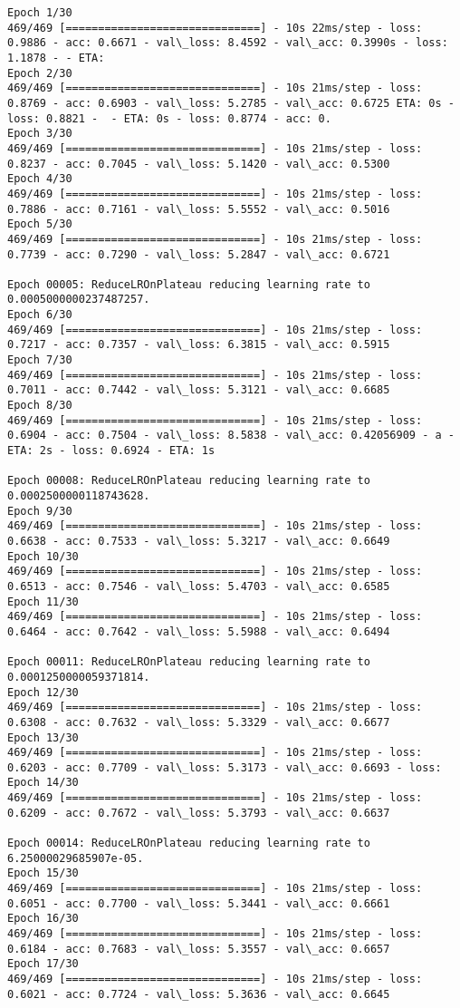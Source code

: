 \documentclass[11pt]{article}
\begin{document}
    \begin{Verbatim}[commandchars=\\\{\}]
Epoch 1/30
469/469 [==============================] - 10s 22ms/step - loss: 0.9886 - acc: 0.6671 - val\_loss: 8.4592 - val\_acc: 0.3990s - loss: 1.1878 - - ETA:
Epoch 2/30
469/469 [==============================] - 10s 21ms/step - loss: 0.8769 - acc: 0.6903 - val\_loss: 5.2785 - val\_acc: 0.6725 ETA: 0s - loss: 0.8821 -  - ETA: 0s - loss: 0.8774 - acc: 0.
Epoch 3/30
469/469 [==============================] - 10s 21ms/step - loss: 0.8237 - acc: 0.7045 - val\_loss: 5.1420 - val\_acc: 0.5300
Epoch 4/30
469/469 [==============================] - 10s 21ms/step - loss: 0.7886 - acc: 0.7161 - val\_loss: 5.5552 - val\_acc: 0.5016
Epoch 5/30
469/469 [==============================] - 10s 21ms/step - loss: 0.7739 - acc: 0.7290 - val\_loss: 5.2847 - val\_acc: 0.6721

Epoch 00005: ReduceLROnPlateau reducing learning rate to 0.0005000000237487257.
Epoch 6/30
469/469 [==============================] - 10s 21ms/step - loss: 0.7217 - acc: 0.7357 - val\_loss: 6.3815 - val\_acc: 0.5915
Epoch 7/30
469/469 [==============================] - 10s 21ms/step - loss: 0.7011 - acc: 0.7442 - val\_loss: 5.3121 - val\_acc: 0.6685
Epoch 8/30
469/469 [==============================] - 10s 21ms/step - loss: 0.6904 - acc: 0.7504 - val\_loss: 8.5838 - val\_acc: 0.42056909 - a - ETA: 2s - loss: 0.6924 - ETA: 1s

Epoch 00008: ReduceLROnPlateau reducing learning rate to 0.0002500000118743628.
Epoch 9/30
469/469 [==============================] - 10s 21ms/step - loss: 0.6638 - acc: 0.7533 - val\_loss: 5.3217 - val\_acc: 0.6649
Epoch 10/30
469/469 [==============================] - 10s 21ms/step - loss: 0.6513 - acc: 0.7546 - val\_loss: 5.4703 - val\_acc: 0.6585
Epoch 11/30
469/469 [==============================] - 10s 21ms/step - loss: 0.6464 - acc: 0.7642 - val\_loss: 5.5988 - val\_acc: 0.6494

Epoch 00011: ReduceLROnPlateau reducing learning rate to 0.0001250000059371814.
Epoch 12/30
469/469 [==============================] - 10s 21ms/step - loss: 0.6308 - acc: 0.7632 - val\_loss: 5.3329 - val\_acc: 0.6677
Epoch 13/30
469/469 [==============================] - 10s 21ms/step - loss: 0.6203 - acc: 0.7709 - val\_loss: 5.3173 - val\_acc: 0.6693 - loss: 
Epoch 14/30
469/469 [==============================] - 10s 21ms/step - loss: 0.6209 - acc: 0.7672 - val\_loss: 5.3793 - val\_acc: 0.6637

Epoch 00014: ReduceLROnPlateau reducing learning rate to 6.25000029685907e-05.
Epoch 15/30
469/469 [==============================] - 10s 21ms/step - loss: 0.6051 - acc: 0.7700 - val\_loss: 5.3441 - val\_acc: 0.6661
Epoch 16/30
469/469 [==============================] - 10s 21ms/step - loss: 0.6184 - acc: 0.7683 - val\_loss: 5.3557 - val\_acc: 0.6657
Epoch 17/30
469/469 [==============================] - 10s 21ms/step - loss: 0.6021 - acc: 0.7724 - val\_loss: 5.3636 - val\_acc: 0.6645


\end{Verbatim}
\end{document}

